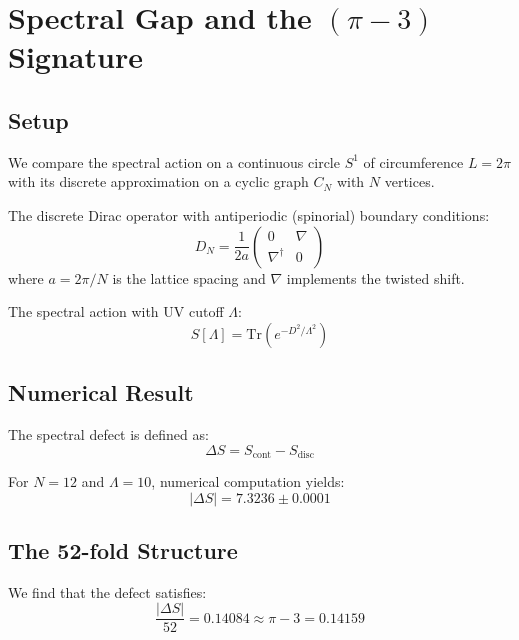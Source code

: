 \section{Spectral Gap and the $(\pi - 3)$ Signature}

\subsection{Setup}

We compare the spectral action on a continuous circle $S^1$ of circumference $L = 2\pi$ with its discrete approximation on a cyclic graph $C_N$ with $N$ vertices.

The discrete Dirac operator with antiperiodic (spinorial) boundary conditions:
\begin{equation}
D_N = \frac{1}{2a}\begin{pmatrix} 0 & \nabla \\ \nabla^\dagger & 0 \end{pmatrix}
\end{equation}
where $a = 2\pi/N$ is the lattice spacing and $\nabla$ implements the twisted shift.

The spectral action with UV cutoff $\Lambda$:
\begin{equation}
S[\Lambda] = \mathrm{Tr}\left( e^{-D^2/\Lambda^2} \right)
\end{equation}

\subsection{Numerical Result}

The spectral defect is defined as:
\begin{equation}
\Delta S = S_{\text{cont}} - S_{\text{disc}}
\end{equation}

For $N = 12$ and $\Lambda = 10$, numerical computation yields:
\begin{equation}
|\Delta S| = 7.3236 \pm 0.0001
\end{equation}

\subsection{The 52-fold Structure}

We find that the defect satisfies:
\begin{equation}
\boxed{\frac{|\Delta S|}{52} = 0.14084 \approx \pi - 3 = 0.14159}
\end{equation}

